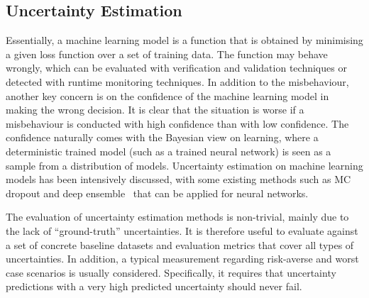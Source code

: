 \subsection*{Uncertainty Estimation}



Essentially, a machine learning model is  a function that is obtained by minimising a given loss function over a set of training data. The function may behave wrongly, which can be evaluated with verification and validation techniques or detected with runtime monitoring techniques. In addition to the misbehaviour, another key concern is on the confidence of the machine learning model in making the wrong decision. It is clear that the situation is worse if a misbehaviour is conducted with high confidence than with low confidence. The confidence naturally comes with the Bayesian view on learning, where a deterministic trained model (such as a trained neural network) is seen as a sample from a distribution of models. Uncertainty estimation on machine learning models has been intensively discussed, with some existing methods such as MC dropout \cite{10.5555/3045390.3045502} and deep ensemble~\cite{DBLP:conf/nips/Lakshminarayanan17} that can be applied for neural networks. 

The evaluation of uncertainty estimation methods is non-trivial, mainly due to the lack of ``ground-truth'' uncertainties. It is therefore useful to evaluate against a set of concrete baseline datasets and evaluation metrics that cover all types of uncertainties. In addition, a typical measurement regarding risk-averse and worst case scenarios is usually considered. Specifically, it requires that uncertainty predictions with a very high predicted uncertainty should never fail. 
